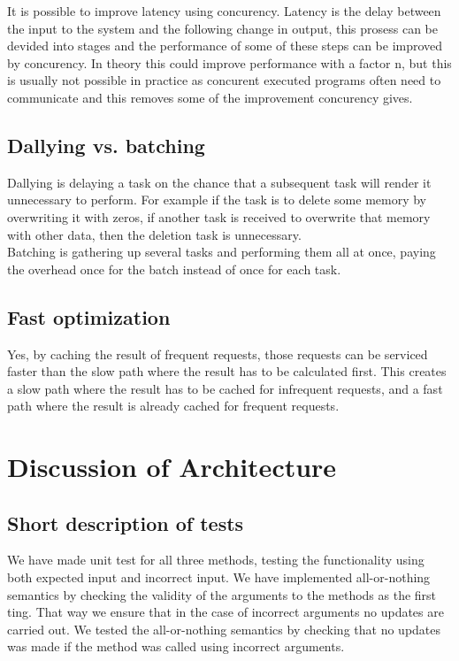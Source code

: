 \documentclass{article}
\theoremstyle{plain}
\theoremstyle{nonumberplain}
\begin{document}
It is possible to improve latency using concurency. Latency is the delay between the input to the system and the following change in output, this prosess can be devided into stages and the performance of some of these steps can be improved by concurency. In theory this could improve performance with a factor n, but this is usually not possible in practice as concurent executed programs often need to communicate and this removes some of the improvement concurency gives.

\subsection{Dallying vs. batching}

Dallying is delaying a task on the chance that a subsequent task will render it unnecessary to perform. For example if the task is to delete some memory by overwriting it with zeros, if another task is received to overwrite that memory with other data, then the deletion task is unnecessary. \\
Batching is gathering up several tasks and performing them all at once, paying the overhead once for the batch instead of once for each task.

\subsection{Fast optimization}

Yes, by caching the result of frequent requests, those requests can be serviced faster than the slow path where the result has to be calculated first. This creates a slow path where the result has to be cached for infrequent requests, and a fast path where the result is already cached for frequent requests.

\section{Discussion of Architecture}

\subsection{Short description of tests}

We have made unit test for all three methods, testing the functionality using both expected input and incorrect input.
We have implemented all-or-nothing semantics by checking the validity of the arguments to the methods as the first ting. That way we ensure that in the case of incorrect arguments no updates are carried out. 
We tested the all-or-nothing semantics by checking that no updates was made if the method was called using incorrect arguments. 
\end{document}
